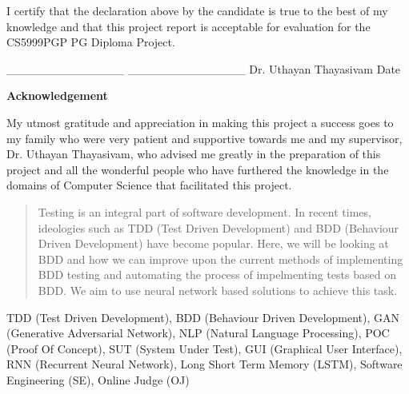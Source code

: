 \documentclass[conference, onecolumn, a4, 12pt]{IEEEtran}
\newcommand\tab[1][1cm]{\hspace*{#1}}
\begin{document}
I certify that the declaration above by the candidate is true to the best of my knowledge and that this project report is acceptable for evaluation for the CS5999PGP PG Diploma Project.\newline\newline

\_\_\_\_\_\_\_\_\_\_\_\_\_\_ \tab\tab\tab\tab\tab\tab\tab \_\_\_\_\_\_\_\_\_\_\_\_\_\_\newline\newline
Dr. Uthayan Thayasivam \tab\tab\tab\tab\tab\tab\tab Date

\pagebreak

\begin{center}
\textbf{Acknowledgement}
\end{center}
My utmost gratitude and appreciation in making this project a success goes to my family who were very patient and supportive towards me and my supervisor, Dr. Uthayan Thayasivam, who advised me greatly in the preparation of this project and all the wonderful people who have furthered the knowledge in the domains of Computer Science that facilitated this project.

\pagebreak

\tableofcontents
\pagebreak

\begin{abstract}
Testing is an integral part of software development. In recent times, ideologies such as TDD (Test Driven Development) and BDD (Behaviour Driven Development) have become popular. Here, we will be looking at BDD and how we can improve upon the current methods of implementing BDD testing and automating the process of impelmenting tests based on BDD. We aim to use neural network based solutions to achieve this task.  
\end{abstract}

\begin{IEEEkeywords}
TDD (Test Driven Development), BDD (Behaviour Driven Development), GAN (Generative Adversarial Network), NLP (Natural Language Processing), POC (Proof Of Concept), SUT (System Under Test), GUI (Graphical User Interface), RNN (Recurrent Neural Network), Long Short Term Memory (LSTM), Software Engineering (SE), Online Judge (OJ) 
\end{IEEEkeywords}
\end{document}
